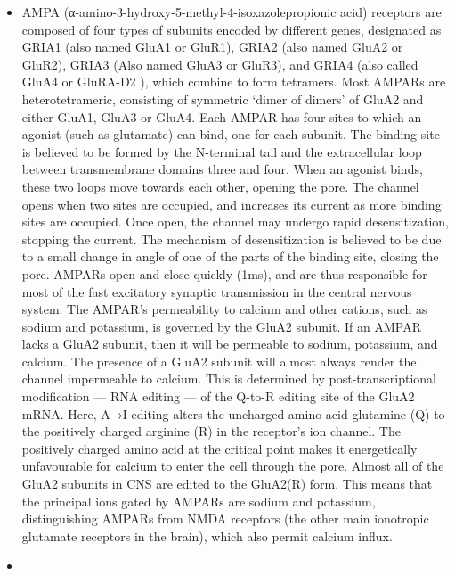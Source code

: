 \begin{itemize}
  \begin{itemize}
  \tightlist
  \item
    AMPA (α-amino-3-hydroxy-5-methyl-4-isoxazolepropionic acid) receptors are composed of four types of subunits encoded by different genes, designated as GRIA1 (also named GluA1 or GluR1), GRIA2 (also named GluA2 or GluR2), GRIA3 (Also named GluA3 or GluR3), and GRIA4 (also called GluA4 or GluRA-D2 ), which combine to form tetramers. Most AMPARs are heterotetrameric, consisting of symmetric `dimer of dimers' of GluA2 and either GluA1, GluA3 or GluA4. Each AMPAR has four sites to which an agonist (such as glutamate) can bind, one for each subunit. The binding site is believed to be formed by the N-terminal tail and the extracellular loop between transmembrane domains three and four. When an agonist binds, these two loops move towards each other, opening the pore. The channel opens when two sites are occupied, and increases its current as more binding sites are occupied. Once open, the channel may undergo rapid desensitization, stopping the current. The mechanism of desensitization is believed to be due to a small change in angle of one of the parts of the binding site, closing the pore. AMPARs open and close quickly (1ms), and are thus responsible for most of the fast excitatory synaptic transmission in the central nervous system. The AMPAR's permeability to calcium and other cations, such as sodium and potassium, is governed by the GluA2 subunit. If an AMPAR lacks a GluA2 subunit, then it will be permeable to sodium, potassium, and calcium. The presence of a GluA2 subunit will almost always render the channel impermeable to calcium. This is determined by post-transcriptional modification --- RNA editing --- of the Q-to-R editing site of the GluA2 mRNA. Here, A→I editing alters the uncharged amino acid glutamine (Q) to the positively charged arginine (R) in the receptor's ion channel. The positively charged amino acid at the critical point makes it energetically unfavourable for calcium to enter the cell through the pore. Almost all of the GluA2 subunits in CNS are edited to the GluA2(R) form. This means that the principal ions gated by AMPARs are sodium and potassium, distinguishing AMPARs from NMDA receptors (the other main ionotropic glutamate receptors in the brain), which also permit calcium influx.
  \item

\end{itemize}
\end{itemize}
